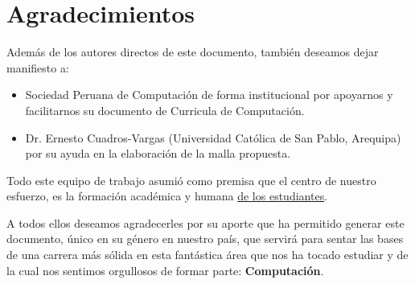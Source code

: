 \chapter*{Agradecimientos}\label{chap:cs-ack}
%

Además de los autores directos de este documento, también deseamos dejar manifiesto a:

\begin{itemize}
\item Sociedad Peruana de Computación de forma institucional por apoyarnos y facilitarnos su documento de Curricula de Computación.

\item Dr. Ernesto Cuadros-Vargas (Universidad Católica de San Pablo, Arequipa) por su ayuda en la elaboración de la malla propuesta. 
\end{itemize}

Todo este equipo de trabajo asumió como premisa que el centro de nuestro esfuerzo,
es la formación académica y humana \underline{de los estudiantes}.

A todos ellos deseamos agradecerles por su aporte que ha permitido generar 
este documento, único en su género en nuestro país, que servirá para sentar las 
bases de una carrera más sólida en esta fantástica área que nos ha tocado estudiar y 
de la cual nos sentimos orgullosos de formar parte: \textbf{Computación}.
